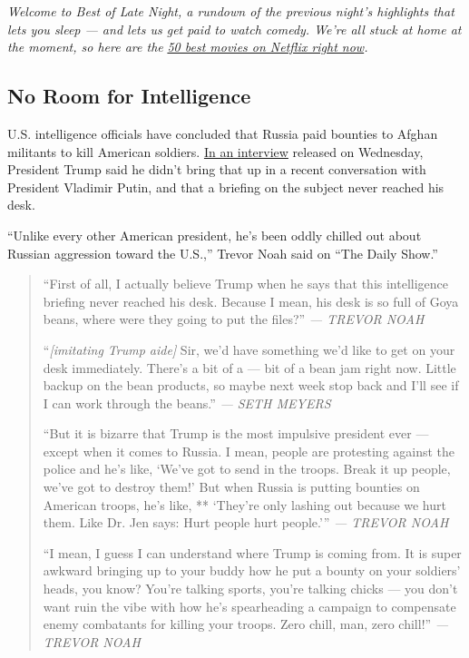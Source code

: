 \emph{Welcome to Best of Late Night, a rundown of the previous night's
highlights that lets you sleep --- and lets us get paid to watch comedy.
We're all stuck at home at the moment, so here are the}
\href{https://www.nytimes3xbfgragh.onion/interactive/2020/arts/television/best-movies-on-netflix.html}{\emph{50
best movies on Netflix right now}}\emph{.}

\hypertarget{no-room-for-intelligence}{%
\subsection{No Room for Intelligence}\label{no-room-for-intelligence}}

U.S. intelligence officials have concluded that Russia paid bounties to
Afghan militants to kill American soldiers.
\href{https://www.nytimes3xbfgragh.onion/2020/07/29/us/politics/trump-putin-bounties.html}{In
an interview} released on Wednesday, President Trump said he didn't
bring that up in a recent conversation with President Vladimir Putin,
and that a briefing on the subject never reached his desk.

``Unlike every other American president, he's been oddly chilled out
about Russian aggression toward the U.S.,'' Trevor Noah said on ``The
Daily Show.''

\begin{quote}
``First of all, I actually believe Trump when he says that this
intelligence briefing never reached his desk. Because I mean, his desk
is so full of Goya beans, where were they going to put the files?''
\emph{--- TREVOR NOAH}

``\emph{{[}imitating Trump aide{]}} Sir, we'd have something we'd like
to get on your desk immediately. There's a bit of a --- bit of a bean
jam right now. Little backup on the bean products, so maybe next week
stop back and I'll see if I can work through the beans.'' \emph{--- SETH
MEYERS}

``But it is bizarre that Trump is the most impulsive president ever ---
except when it comes to Russia. I mean, people are protesting against
the police and he's like, `We've got to send in the troops. Break it up
people, we've got to destroy them!' But when Russia is putting bounties
on American troops, he's like, ** `They're only lashing out because we
hurt them. Like Dr. Jen says: Hurt people hurt people.''' \emph{---
TREVOR NOAH}

``I mean, I guess I can understand where Trump is coming from. It is
super awkward bringing up to your buddy how he put a bounty on your
soldiers' heads, you know? You're talking sports, you're talking chicks
--- you don't want ruin the vibe with how he's spearheading a campaign
to compensate enemy combatants for killing your troops. Zero chill, man,
zero chill!'' \emph{--- TREVOR NOAH}
\end{quote}

